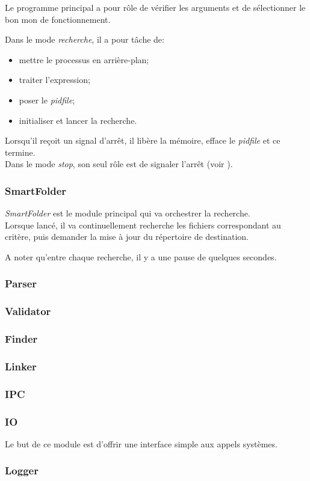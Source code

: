 \documentclass[11pt, a4paper]{article}
\begin{document}
Le programme principal a pour rôle de vérifier les arguments et de sélectionner le bon mon de fonctionnement.

Dans le mode \textit{recherche}, il a pour tâche de:
\begin{itemize}
    \item mettre le processus en arrière-plan;
    \item traiter l'expression;
    \item poser le \textit{pidfile};
    \item initialiser et lancer la recherche.
\end{itemize}

Lorsqu'il reçoit un signal d'arrêt, il libère la mémoire, efface le \textit{pidfile} et ce termine. \\

Dans le mode \textit{stop}, son seul rôle est de signaler l'arrêt (voir ).

\subsubsection{SmartFolder}
\textit{SmartFolder} est le module principal qui va orchestrer la recherche. \\

Lorsque lancé, il va continuellement recherche les fichiers correspondant au critère,
puis demander la mise à jour du répertoire de destination.

A noter qu'entre chaque recherche, il y a une pause de quelques secondes.

\subsubsection{Parser}

\subsubsection{Validator}

\subsubsection{Finder}

\subsubsection{Linker}

\subsubsection{IPC}
\label{sec:ipc}

\subsubsection{IO}
Le but de ce module est d'offrir une interface simple aux appels systèmes.

\subsubsection{Logger}
\end{document}

